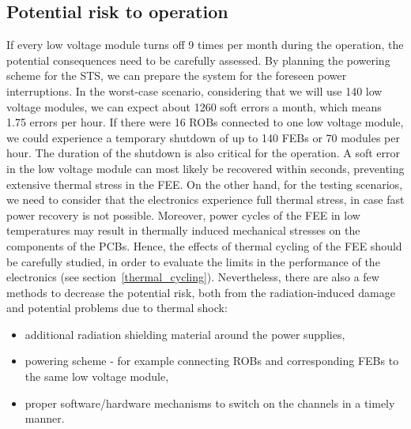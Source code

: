 \subsection{Potential risk to operation}
If every low voltage module turns off 9 times per month during the operation, the potential consequences need to be carefully assessed. By planning the powering scheme for the STS, we can prepare the system for the foreseen power interruptions. In the worst-case scenario, considering that we will use 140 low voltage modules, we can expect about 1260 soft errors a month, which means 1.75 errors per hour.  If there were 16 ROBs connected to one low voltage module, we could experience a temporary shutdown of up to 140 FEBs or 70 modules per hour.  The duration of the shutdown is also critical for the operation. A soft error in the low voltage module can most likely be recovered within seconds, preventing extensive thermal stress in the FEE. On the other hand, for the testing scenarios, we need to consider that the electronics experience full thermal stress, in case fast power recovery is not possible. Moreover, power cycles of the FEE in low temperatures may result in thermally induced mechanical stresses on the components of the PCBs. Hence, the effects of thermal cycling of the FEE should be carefully studied, in order to evaluate the limits in the performance of the electronics  (see section~\ref{thermal_cycling}). Nevertheless, there are also a few methods to decrease the potential risk, both from the radiation-induced damage and potential problems due to thermal shock:
\begin{itemize}
    \item additional radiation shielding material around the power supplies,
    \item powering scheme - for example connecting ROBs and corresponding FEBs to the same low voltage module,
    \item proper software/hardware mechanisms to switch on the channels in a timely manner.
\end{itemize}

